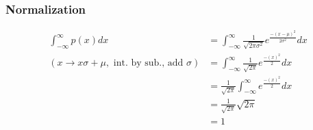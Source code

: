 	\subsubsection*{Normalization} %
	\label{ssub:normalization}

	\begin{align*}   
	\int_{-\infty}^{\infty}p(x)dx &=  \int_{-\infty}^{\infty}\frac{1}{\sqrt{2\pi\sigma^2}}e^\frac{-(x-\mu)^2}{2\sigma^2}dx \\
	(x \to x \sigma + \mu, \text{ int. by sub., add } \sigma) 
	&= \int_{-\infty}^{\infty}\frac{1}{\sqrt{2\pi}}e^\frac{-(x)^2}{2}dx \\ 
	&= \frac{1}{\sqrt{2\pi}}\int_{-\infty}^{\infty}e^\frac{-(x)^2}{2}dx \\
	&= \frac{1}{\sqrt{2\pi}}\sqrt{2\pi} \\ 
	&= 1
	\end{align*}





